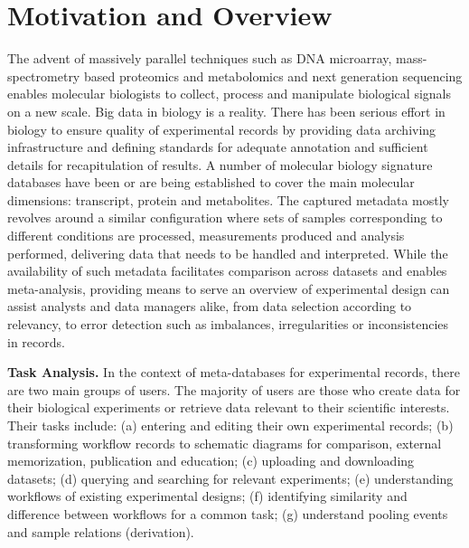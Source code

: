 
\section{Motivation and Overview}
\label{sec:Motivation}
%
The advent of massively parallel techniques such as DNA microarray, mass-spectrometry based proteomics and metabolomics and next generation sequencing enables molecular biologists to collect, process and manipulate biological signals on a new scale.
Big data in biology is a reality.
There has been serious effort in biology to ensure quality of experimental records by providing data archiving infrastructure and defining standards for adequate annotation and sufficient details for recapitulation of results.
A number of molecular biology signature databases have been or are being established to cover the main molecular dimensions: transcript, protein and metabolites.
The captured metadata mostly revolves around a similar configuration where sets of samples corresponding to different conditions are processed, measurements produced and analysis performed, delivering data that needs to be handled and interpreted.
While the availability of such metadata facilitates comparison across datasets and enables meta-analysis, providing means to serve an overview of experimental design can assist analysts and data managers alike, from data selection according to relevancy, to error detection such as imbalances, irregularities or inconsistencies in records.

\textbf{Task Analysis.} In the context of meta-databases for experimental records, there are two main groups of users. The majority of users are those who create data for their biological experiments or retrieve data relevant to their scientific interests. Their tasks include:
(a) entering and editing their own experimental records;
(b) transforming workflow records to schematic diagrams for comparison, external memorization, publication and education;
(c) uploading and downloading datasets;
(d) querying and searching for relevant experiments;
(e) understanding workflows of existing experimental designs;
(f) identifying similarity and difference between workflows for a common task;
(g) understand pooling events and sample relations (derivation).

